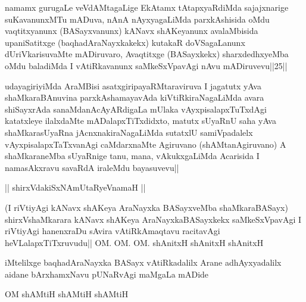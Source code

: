 \begin{artha}
namamx gurugaLe veVdAMtagaLige EkAtamx tAtapxyaRdiMda sajajxnarige 
suKavanunxMTu mADuva, nAnA nAyxyagaLiMda parxkAshisida oMdu 
vaqtitxyanunx (BASayxvanunx) kANavx shAKeyanunx avalaMbisida 
upaniSatitxge (baqhadAraNayxkakekx) kutakaR doVSagaLanunx 
dUriVkarisuvaMte mADiruvaro, Avaqtitxge (BASayxkekx) sharxdedhxyeMba 
oMdu baladiMda I vAtiRkavanunx saMkeSxVpavAgi nAvu mADiruvevu||25||
\end{artha}

\begin{artha}
udayagiriyiMda AraMBisi asatxgiripayaRMtaraviruva I jagatutx yAva 
shaMkaraBAnuvina parxkAshamayavAda kiVtiRkiraNagaLiMda avara 
shiSayxrAda sanaMdanAcAyARdigaLa mUlaka vAyxpisalapxTuTxdAgi 
katatxleye ilalxdaMte mADalapxTiTxdidxto, matutx sUyaRnU saha yAva 
shaMkarasUyaRna jAcnxnakiraNagaLiMda sutatxlU samiVpadalelx 
vAyxpisalapxTaTxvanAgi caMdarxnaMte Agiruvano (shAMtanAgiruvano) A 
shaMkaraneMba sUyaRnige tanu, mana, vAkukxgaLiMda Acarisida I 
namasAkxravu savaRdA iraleMdu bayasuvevu||
\end{artha}

\begin{center}
|| shirxVdakiSxNAmUtaRyeVnamaH ||
\end{center}

\stext

\stext

\begin{artha}
(I riVtiyAgi kANavx shAKeya AraNayxka BASayxveMba shaMkaraBASayx) 
shirxVshaMkarara kANavx shAKeya AraNayxkaBASayxkekx saMkeSxVpavAgi I 
riVtiyAgi hanenxraDu sAvira vAtiRkAmaqtavu racitavAgi 
heVLalapxTiTxruvudu|| OM. OM. OM. shAnitxH shAnitxH shAnitxH
\end{artha}

\begin{center}
iMtelilxge baqhadAraNayxka BASayx vAtiRkadalilx Arane adhAyxyadalilx 
aidane bArxhamxNavu pUNaRvAgi maMgaLa mADide
\end{center}

\stext

\begin{center}
OM shAMtiH shAMtiH shAMtiH
\end{center}


